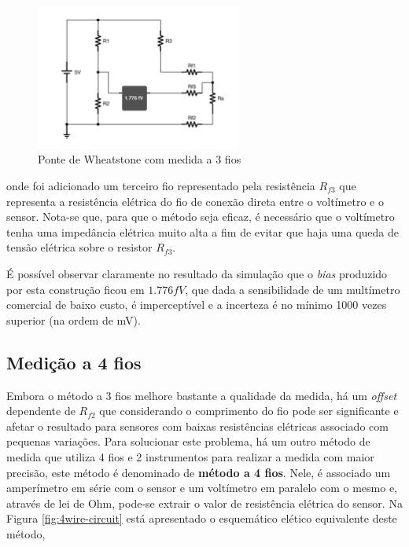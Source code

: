 \documentclass[a4paper]{instrumentacao}
\begin{document}
\begin{figure}[H]
\centering
\includegraphics[width=0.6\textwidth]{Wheatstone-Bridge-3Wire.pdf}
\caption{Ponte de Wheatstone com medida a 3 fios}
\label{fig:wheatstone-3wire}
\end{figure}

\noindent onde foi adicionado um terceiro fio representado pela resistência $R_{f3}$ que representa a resistência elétrica do fio de conexão direta entre o voltímetro e o sensor. Nota-se que, para que o método seja eficaz, é necessário que o voltímetro tenha uma impedância elétrica muito alta a fim de evitar que haja uma queda de tensão elétrica sobre o resistor $R_{f3}$.

É possível observar claramente no resultado da simulação que o \textit{bias} produzido por esta construção ficou em $1.776 fV$, que dada a sensibilidade de um multímetro comercial de baixo custo, é imperceptível e a incerteza é no mínimo 1000 vezes superior (na ordem de mV).


\subsection{Medição a 4 fios}

Embora o método a 3 fios melhore bastante a qualidade da medida, há um \textit{offset} dependente de $R_{f2}$ que considerando o comprimento do fio pode ser significante e afetar o resultado para sensores com baixas resistências elétricas associado com pequenas variações. Para solucionar este problema, há um outro método de medida que utiliza 4 fios e 2 instrumentos para realizar a medida com maior precisão, este método é denominado de \textbf{método a 4 fios}. Nele, é associado um amperímetro em série com o sensor e um voltímetro em paralelo com o mesmo e, através de lei de Ohm, pode-se extrair o valor de resistência elétrica do sensor. Na Figura \ref{fig:4wire-circuit} está apresentado o esquemático elético equivalente deste método,
\end{document}
